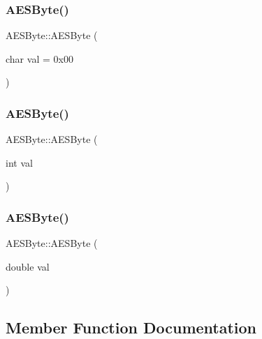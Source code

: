 \subsubsection{\texorpdfstring{AESByte()}{AESByte()}\hspace{0.1cm}{\footnotesize\ttfamily [1/3]}}
{\footnotesize\ttfamily A\+E\+S\+Byte\+::\+A\+E\+S\+Byte (\begin{DoxyParamCaption}\item[{char}]{val = {\ttfamily 0x00} }\end{DoxyParamCaption})}

\mbox{\label{class_a_e_s_byte_acdc2074102fba0b7de1213c678f2854d}} 
\subsubsection{\texorpdfstring{AESByte()}{AESByte()}\hspace{0.1cm}{\footnotesize\ttfamily [2/3]}}
{\footnotesize\ttfamily A\+E\+S\+Byte\+::\+A\+E\+S\+Byte (\begin{DoxyParamCaption}\item[{int}]{val }\end{DoxyParamCaption})}

\mbox{\label{class_a_e_s_byte_a02b420231291940553c99362177e1477}} 
\subsubsection{\texorpdfstring{AESByte()}{AESByte()}\hspace{0.1cm}{\footnotesize\ttfamily [3/3]}}
{\footnotesize\ttfamily A\+E\+S\+Byte\+::\+A\+E\+S\+Byte (\begin{DoxyParamCaption}\item[{double}]{val }\end{DoxyParamCaption})}



\subsection{Member Function Documentation}
\mbox{\label{class_a_e_s_byte_afce401be62feaec7f04b46801fa35547}} 
